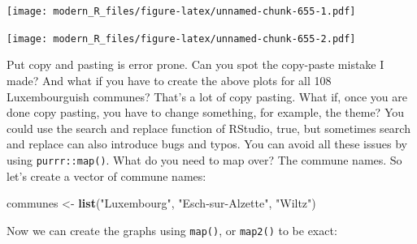 \documentclass[]{gitbook}
\newenvironment{Shaded}{\begin{snugshade}}{\end{snugshade}}
\newcommand{\DataTypeTok}[1]{\textcolor[rgb]{0.13,0.29,0.53}{#1}}
\newcommand{\KeywordTok}[1]{\textcolor[rgb]{0.13,0.29,0.53}{\textbf{#1}}}
\newcommand{\NormalTok}[1]{#1}
\newcommand{\OperatorTok}[1]{\textcolor[rgb]{0.81,0.36,0.00}{\textbf{#1}}}
\newcommand{\StringTok}[1]{\textcolor[rgb]{0.31,0.60,0.02}{#1}}
\begin{document}
\texttt{[image: modern\_R\_files/figure-latex/unnamed-chunk-655-1.pdf]}

\begin{Shaded}
\end{Shaded}

\texttt{[image: modern\_R\_files/figure-latex/unnamed-chunk-655-2.pdf]}

Put copy and pasting is error prone. Can you spot the copy-paste mistake I made? And what if you
have to create the above plots for all 108 Luxembourguish communes? That's a lot of copy pasting.
What if, once you are done copy pasting, you have to change something, for example, the theme? You
could use the search and replace function of RStudio, true, but sometimes search and replace can
also introduce bugs and typos. You can avoid all these issues by using \texttt{purrr::map()}. What do you
need to map over? The commune names. So let's create a vector of commune names:

\begin{Shaded}
\begin{Highlighting}[]
\NormalTok{communes <-}\StringTok{ }\KeywordTok{list}\NormalTok{(}\StringTok{"Luxembourg"}\NormalTok{, }\StringTok{"Esch-sur-Alzette"}\NormalTok{, }\StringTok{"Wiltz"}\NormalTok{)}
\end{Highlighting}
\end{Shaded}

Now we can create the graphs using \texttt{map()}, or \texttt{map2()} to be exact:
\end{document}
